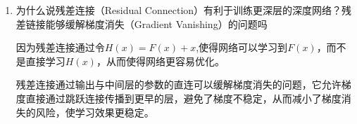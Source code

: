\documentclass[a4paper,9pt]{article}
\begin{document}
\begin{enumerate}
    \item 为什么说残差连接（Residual Connection）有利于训练更深层的深度网络？残差链接能够缓解梯度消失（Gradient Vanishing）的问题吗
    
    因为残差连接通过令$H(x)=F(x)+x$,使得网络可以学习到$F(x)$，而不是直接学习$H(x)$，从而使得网络更容易优化。
    
    残差连接通过输出与中间层的参数的直连可以缓解梯度消失的问题，它允许梯度直接通过跳跃连接传播到更早的层，避免了梯度不稳定，从而减小了梯度消失的风险，使学习效果更稳定。

\end{enumerate}
\end{document}
